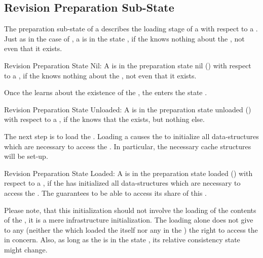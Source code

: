 \documentclass[a4paper, 12pt]{book}
\begin{document}
\subsection{Revision Preparation Sub-State}


The preparation sub-state of a  describes the loading
stage of a  with respect to a .  Just as in
the case of , a  is in the state
\revprepstateNIL, if the  knows nothing about the
, not even that it exists.
%
\begin{definition*}{Revision Preparation State Nil: \revprepstateNIL}
  A  is in the preparation state nil (\revprepstateNIL)
  with respect to a ,
  if the  knows nothing about the , not even
  that it exists. 
\end{definition*}
%
Once the  learns about the existence of the
, the  enters the state
\revprepstateUNLOADED.
%
\begin{definition*}{Revision Preparation State Unloaded: \revprepstateUNLOADED}
  A  is in the preparation state unloaded
  (\revprepstateUNLOADED) with respect to a , if the
   knows that the  exists, but nothing else. 
\end{definition*}
%
The next step is to load the . Loading a 
causes the \SYNEIGHT to initialize all data-structures which are
necessary to access the . In particular, the necessary
cache structures will be set-up. 
%
\begin{definition*}{Revision Preparation State Loaded: \revprepstateLOADED}
  A  is in the preparation state loaded
  (\revprepstateLOADED) with respect to a , if the
   has initialized all data-structures which are necessary to
  access the . The  guarantees to be able
  to access its share of this .
\end{definition*}
%
Please note, that this initialization should not involve the loading
of the contents of the , it is a mere infrastructure
initialization. The loading alone does not give to any 
(neither the  which loaded the  itself nor
any  in the ) the right to access the
 in concern. Also, as long as the  is 
in the state \revprepstateLOADED, its relative consistency state might
change.
\end{document}
